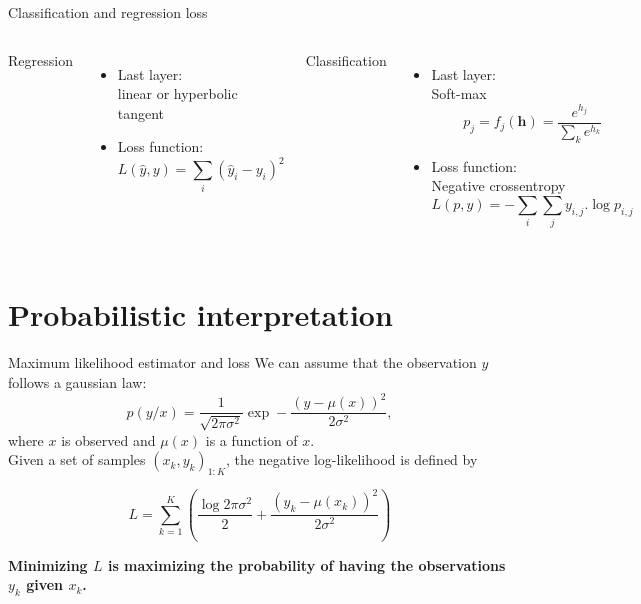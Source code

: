\documentclass[handout, 10pt]{beamer}
\begin{document}
\begin{frame}{Classification and regression loss}
  
   \begin{columns}
   \alert{Regression}
   \begin{itemize}
       \item Last layer:\\
       linear or hyperbolic tangent
       \item Loss function:\\
       $$L(\hat{y},y) = \sum_i (\hat{y}_i-y_i)^2$$
   \end{itemize}
   \pause
{}
       \alert{Classification}
   \begin{itemize}
       \item Last layer:\\
       Soft-max
       $$
       p_j=f_j(\mathbf{h}) = \frac{e^{h_j}}{\sum_k e^{h_k}}
       $$
       
       \item Loss function:\\
       Negative crossentropy
       $$L(p,y) = -\sum_i \sum_j y_{i,j}.\log{p_{i,j}}$$
   \end{itemize}
   \end{columns}
\end{frame}


\section{Probabilistic interpretation}
\begin{frame}{Maximum likelihood estimator and loss}
    We can assume that the observation $y$ follows a gaussian law:
    $$
p(y/x) = \frac{1}{\sqrt{2\pi\sigma^2}}\exp -\frac{(y - \mu(x))^2}{2\sigma^2},
    $$
    where $x$ is observed and $\mu(x)$ is a function of $x$.\\
    
    Given a set of samples $(x_k,y_k)_{1:K}$, the negative log-likelihood is defined by
    
    $$
L = \sum_{k=1}^{K} \left(\frac{\log 2\pi\sigma^2}{2} + \frac{(y_k - \mu(x_k))^2}{2\sigma^2}\right)
$$

\alert{\bf Minimizing $L$ is maximizing the probability of having the observations $y_k$ given $x_k$.}
\end{frame}
\end{document}
